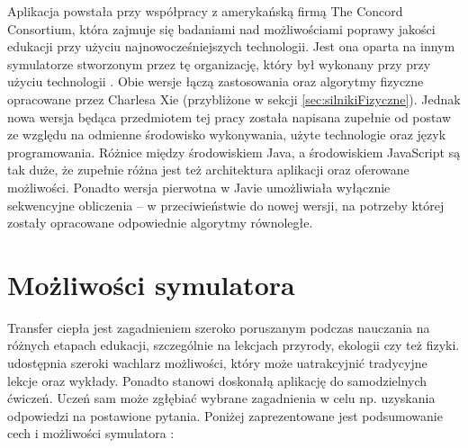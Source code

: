 Aplikacja powstała przy współpracy z amerykańską firmą The Concord Consortium,
która zajmuje się badaniami nad możliwościami poprawy jakości edukacji przy
użyciu najnowocześniejszych technologii. Jest ona oparta na innym symulatorze
stworzonym przez tę organizację, który był wykonany przy przy użyciu technologii
. Obie wersje łączą zastosowania oraz algorytmy fizyczne opracowane
przez Charlesa Xie (przybliżone w sekcji \ref{sec:silnikiFizyczne}). Jednak nowa
wersja będąca przedmiotem tej pracy została napisana zupełnie od postaw ze
względu na odmienne środowisko wykonywania, użyte technologie oraz język
programowania. Różnice między środowiskiem Java, a środowiskiem JavaScript są
tak duże, że zupełnie różna jest też architektura aplikacji oraz oferowane
możliwości. Ponadto wersja pierwotna w Javie umożliwiała wyłącznie sekwencyjne
obliczenia -- w przeciwieństwie do nowej wersji, na potrzeby której zostały
opracowane odpowiednie algorytmy równoległe.


\section{Możliwości symulatora}

Transfer ciepła jest zagadnieniem szeroko poruszanym podczas nauczania na
różnych etapach edukacji, szczególnie na lekcjach przyrody, ekologii czy też
fizyki. \en udostępnia szeroki wachlarz możliwości, który może uatrakcyjnić
tradycyjne lekcje oraz wykłady. Ponadto stanowi doskonałą aplikację do
samodzielnych ćwiczeń. Uczeń sam może zgłębiać wybrane zagadnienia w celu np.
uzyskania odpowiedzi na postawione pytania. Poniżej zaprezentowane jest
podsumowanie cech i możliwości symulatora \en:

